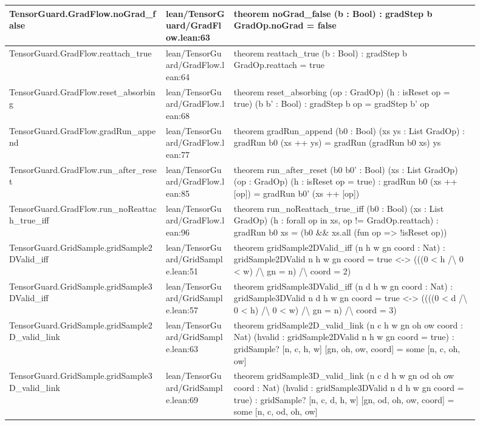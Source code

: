 \documentclass[10pt]{article}
\begin{document}
\begin{longtable}{|p{0.30\linewidth}|p{0.13\linewidth}|p{0.47\linewidth}|}
\hline
TensorGuard.GradFlow.noGrad\_false & lean/TensorGuard/GradFlow.lean:63 & theorem noGrad\_false (b : Bool) : gradStep b GradOp.noGrad = false \\
\hline
TensorGuard.GradFlow.reattach\_true & lean/TensorGuard/GradFlow.lean:64 & theorem reattach\_true (b : Bool) : gradStep b GradOp.reattach = true \\
\hline
TensorGuard.GradFlow.reset\_absorbing & lean/TensorGuard/GradFlow.lean:68 & theorem reset\_absorbing (op : GradOp) (h : isReset op = true) (b b' : Bool) : gradStep b op = gradStep b' op \\
\hline
TensorGuard.GradFlow.gradRun\_append & lean/TensorGuard/GradFlow.lean:77 & theorem gradRun\_append (b0 : Bool) (xs ys : List GradOp) : gradRun b0 (xs ++ ys) = gradRun (gradRun b0 xs) ys \\
\hline
TensorGuard.GradFlow.run\_after\_reset & lean/TensorGuard/GradFlow.lean:85 & theorem run\_after\_reset (b0 b0' : Bool) (xs : List GradOp) (op : GradOp) (h : isReset op = true) : gradRun b0 (xs ++ [op]) = gradRun b0' (xs ++ [op]) \\
\hline
TensorGuard.GradFlow.run\_noReattach\_true\_iff & lean/TensorGuard/GradFlow.lean:96 & theorem run\_noReattach\_true\_iff (b0 : Bool) (xs : List GradOp) (h : forall op in xs, op != GradOp.reattach) : gradRun b0 xs = (b0 \&\& xs.all (fun op => !isReset op)) \\
\hline
TensorGuard.GridSample.gridSample2DValid\_iff & lean/TensorGuard/GridSample.lean:51 & theorem gridSample2DValid\_iff (n h w gn coord : Nat) : gridSample2DValid n h w gn coord = true <-> (((0 < h /\textbackslash{} 0 < w) /\textbackslash{} gn = n) /\textbackslash{} coord = 2) \\
\hline
TensorGuard.GridSample.gridSample3DValid\_iff & lean/TensorGuard/GridSample.lean:57 & theorem gridSample3DValid\_iff (n d h w gn coord : Nat) : gridSample3DValid n d h w gn coord = true <-> ((((0 < d /\textbackslash{} 0 < h) /\textbackslash{} 0 < w) /\textbackslash{} gn = n) /\textbackslash{} coord = 3) \\
\hline
TensorGuard.GridSample.gridSample2D\_valid\_link & lean/TensorGuard/GridSample.lean:63 & theorem gridSample2D\_valid\_link (n c h w gn oh ow coord : Nat) (hvalid : gridSample2DValid n h w gn coord = true) : gridSample? [n, c, h, w] [gn, oh, ow, coord] = some [n, c, oh, ow] \\
\hline
TensorGuard.GridSample.gridSample3D\_valid\_link & lean/TensorGuard/GridSample.lean:69 & theorem gridSample3D\_valid\_link (n c d h w gn od oh ow coord : Nat) (hvalid : gridSample3DValid n d h w gn coord = true) : gridSample? [n, c, d, h, w] [gn, od, oh, ow, coord] = some [n, c, od, oh, ow] \\

\end{longtable}
\end{document}
